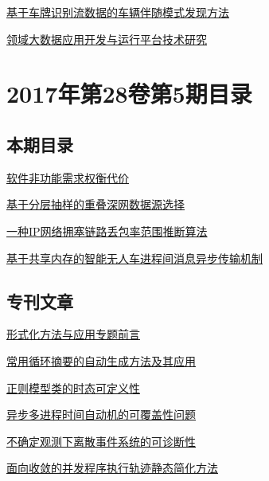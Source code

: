 \documentclass[a4paper]{article}
\begin{document}
\href{http://www.jos.org.cn/ch/reader/create_pdf.aspx?file_no=5220&year_id=2017&quarter_id=6&falg=1}{基于车牌识别流数据的车辆伴随模式发现方法}

\href{http://www.jos.org.cn/ch/reader/create_pdf.aspx?file_no=5231&year_id=2017&quarter_id=6&falg=1}{领域大数据应用开发与运行平台技术研究}


\section{\textbf{2017年第28卷第5期目录}}
\subsection{本期目录}
\href{http://www.jos.org.cn/ch/reader/create_pdf.aspx?file_no=5106&year_id=2017&quarter_id=5&falg=1}{软件非功能需求权衡代价}

\href{http://www.jos.org.cn/ch/reader/create_pdf.aspx?file_no=5105&year_id=2017&quarter_id=5&falg=1}{基于分层抽样的重叠深网数据源选择}

\href{http://www.jos.org.cn/ch/reader/create_pdf.aspx?file_no=5148&year_id=2017&quarter_id=5&falg=1}{一种IP网络拥塞链路丢包率范围推断算法}

\href{http://www.jos.org.cn/ch/reader/create_pdf.aspx?file_no=5144&year_id=2017&quarter_id=5&falg=1}{基于共享内存的智能无人车进程间消息异步传输机制}

\subsection{专刊文章}
\href{http://www.jos.org.cn/ch/reader/create_pdf.aspx?file_no=5219&year_id=2017&quarter_id=5&falg=1}{形式化方法与应用专题前言}

\href{http://www.jos.org.cn/ch/reader/create_pdf.aspx?file_no=5211&year_id=2017&quarter_id=5&falg=1}{常用循环摘要的自动生成方法及其应用}

\href{http://www.jos.org.cn/ch/reader/create_pdf.aspx?file_no=5208&year_id=2017&quarter_id=5&falg=1}{正则模型类的时态可定义性}

\href{http://www.jos.org.cn/ch/reader/create_pdf.aspx?file_no=5209&year_id=2017&quarter_id=5&falg=1}{异步多进程时间自动机的可覆盖性问题}

\href{http://www.jos.org.cn/ch/reader/create_pdf.aspx?file_no=5212&year_id=2017&quarter_id=5&falg=1}{不确定观测下离散事件系统的可诊断性}

\href{http://www.jos.org.cn/ch/reader/create_pdf.aspx?file_no=5210&year_id=2017&quarter_id=5&falg=1}{面向收敛的并发程序执行轨迹静态简化方法}
\end{document}
